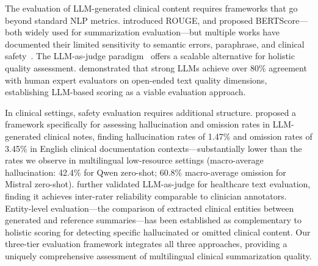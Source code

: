 \documentclass[10pt,twocolumn]{article}
\begin{document}
The evaluation of LLM-generated clinical content requires
frameworks that go beyond standard NLP metrics.
\citet{lin2004rouge} introduced ROUGE, and
\citet{zhang2020bertscore} proposed BERTScore---both widely
used for summarization evaluation---but multiple works have
documented their limited sensitivity to semantic errors,
paraphrase, and clinical safety~\citep{summqa2023}.
The LLM-as-judge paradigm~\citep{zheng2023judging} offers a
scalable alternative for holistic quality assessment.
\citet{zheng2023judging} demonstrated that strong LLMs
achieve over 80\% agreement with human expert evaluators
on open-ended text quality dimensions, establishing
LLM-based scoring as a viable evaluation approach.

In clinical settings, safety evaluation requires additional
structure.
\citet{clus2023framework} proposed a framework specifically
for assessing hallucination and omission rates in LLM-generated
clinical notes, finding hallucination rates of 1.47\% and
omission rates of 3.45\% in English clinical documentation
contexts---substantially lower than the rates we observe
in multilingual low-resource settings (macro-average
hallucination: 42.4\% for Qwen zero-shot;
60.8\% macro-average omission for Mistral zero-shot).
\citet{croxford2025autoeval} further validated LLM-as-judge
for healthcare text evaluation, finding it achieves
inter-rater reliability comparable to clinician annotators.
Entity-level evaluation---the comparison of extracted clinical
entities between generated and reference summaries---has been
established as complementary to holistic scoring
for detecting specific hallucinated or omitted clinical content.
Our three-tier evaluation framework integrates all three
approaches, providing a uniquely comprehensive assessment of
multilingual clinical summarization quality.


\label{sec:data}
\label{sec:method}
\label{sec:eval}
\label{sec:results}
\label{sec:qualitative}
\label{sec:discussion}
\label{sec:conclusion}


\end{document}
